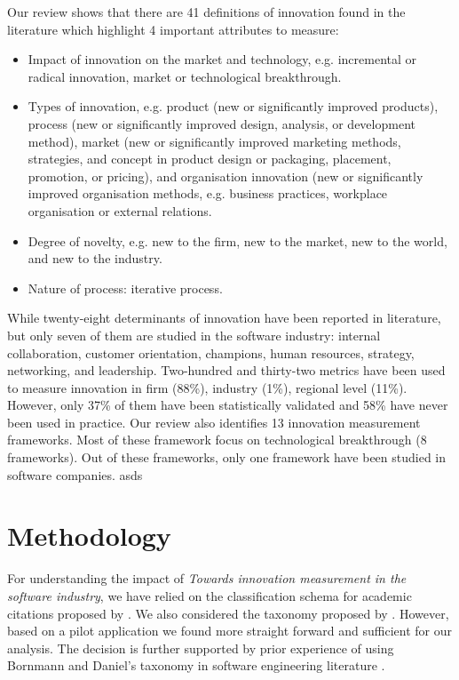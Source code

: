 \documentclass[sigplan]{acmart}
\newcommand{\theArticle}{\textit{Towards innovation measurement in the software industry}}
\begin{document}
Our review shows that there are 41 definitions of innovation found in the literature which highlight 4 important attributes to measure: 
\begin{itemize}
	\item Impact of innovation on the market and technology, e.g. incremental or radical innovation, market or technological breakthrough.
	\item Types of innovation, e.g. product (new or significantly improved products), process (new or significantly improved design, analysis, or development method), market (new or significantly improved marketing methods, strategies, and concept in product design or packaging, placement, promotion, or pricing), and organisation innovation (new or significantly improved organisation methods, e.g. business practices, workplace organisation or external relations.
	\item Degree of novelty, e.g. new to the firm, new to the market, new to the world, and new to the industry.
	\item Nature of process: iterative process.
\end{itemize}

While twenty-eight determinants of innovation have been reported in literature, but only seven of them are studied in the software industry: internal collaboration, customer orientation, champions, human resources, strategy, networking, and leadership. Two-hundred and thirty-two metrics have been used to measure innovation in firm (88\%), industry (1\%), regional level (11\%). However, only 37\% of them have been statistically validated and 58\% have never been used in practice. Our review also identifies 13 innovation measurement frameworks. Most of these framework focus on technological breakthrough (8 frameworks). Out of these frameworks, only one framework have been studied in software companies. asds

\section{Methodology}\label{sec:method} 
For understanding the impact of \theArticle, we have relied on the classification schema for academic citations proposed by \citet{teufel2006annotation}. We also considered the taxonomy proposed by \citet{bornmann2008citation}. However, based on a pilot application we found \citet{teufel2006annotation} more straight forward and sufficient for our analysis. The decision is further supported by prior experience of using Bornmann and Daniel's taxonomy in software engineering literature \cite{poulding2015using}.
\end{document}
